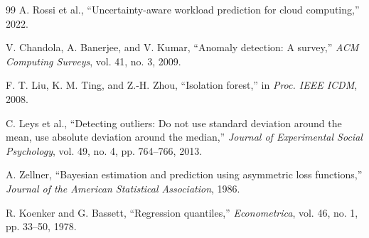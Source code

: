\documentclass[conference]{IEEEtran}
\begin{document}
\begin{thebibliography}{99}
A. Rossi et al.,
``Uncertainty-aware workload prediction for cloud computing,''
2022.

V. Chandola, A. Banerjee, and V. Kumar,
``Anomaly detection: A survey,''
\emph{ACM Computing Surveys}, vol. 41, no. 3, 2009.

F. T. Liu, K. M. Ting, and Z.-H. Zhou,
``Isolation forest,''
in \emph{Proc. IEEE ICDM}, 2008.

C. Leys et al.,
``Detecting outliers: Do not use standard deviation around the mean, use absolute deviation around the median,''
\emph{Journal of Experimental Social Psychology}, vol. 49, no. 4, pp. 764--766, 2013.

A. Zellner,
``Bayesian estimation and prediction using asymmetric loss functions,''
\emph{Journal of the American Statistical Association}, 1986.

R. Koenker and G. Bassett,
``Regression quantiles,''
\emph{Econometrica}, vol. 46, no. 1, pp. 33--50, 1978.

\end{thebibliography}
\end{document}
